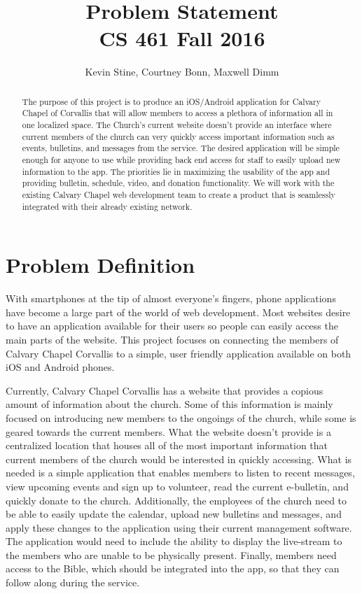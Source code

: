 \documentclass[letterpaper,10pt,draftclsnofoot,onecolumn,titlepage]{IEEEtran}
\def\name{Kevin Stine, Courtney Bonn, Maxwell Dimm}
\begin{document}
	\title{\huge Problem Statement \\ CS 461 Fall 2016}
	\author{\large \name}
	
	\maketitle
		\begin{abstract}The purpose of this project is to produce an iOS/Android application for Calvary Chapel of Corvallis that will allow members to access a plethora of information all in one localized space. 
		The Church's current website doesn't provide an interface where current members of the church can very quickly access important information such as events, bulletins, and messages from the service. 
		The desired application will be simple enough for anyone to use while providing back end access for staff to easily upload new information to the app. 
		The priorities lie in maximizing the usability of the app and providing bulletin, schedule, video, and donation functionality. 
		We will work with the existing Calvary Chapel web development team to create a product that is seamlessly integrated with their already existing network. 
		\end{abstract}
	
	\clearpage	
		
	\section*{Problem Definition}
		With smartphones at the tip of almost everyone's fingers, phone applications have become a large part of the world of web development. 
	Most websites desire to have an application available for their users so people can easily access the main parts of the website. 
	This project focuses on connecting the members of Calvary Chapel Corvallis to a simple, user friendly application available on both iOS and Android phones. 

	Currently, Calvary Chapel Corvallis has a website that provides a copious amount of information about the church. 
	Some of this information is mainly focused on introducing new members to the ongoings of the church, while some is geared towards the current members.
	What the website doesn't provide is a centralized location that houses all of the most important information that current members of the church would be interested in quickly accessing.
	What is needed is a simple application that enables members to listen to recent messages, view upcoming events and sign up to volunteer, read the current e-bulletin, and quickly donate to the church. 
	Additionally, the employees of the church need to be able to easily update the calendar, upload new bulletins and messages, and apply these changes to the application using their current management software. 
	The application would need to include the ability to display the live-stream to the members who are unable to be physically present. 
	Finally, members need access to the Bible, which should be integrated into the app, so that they can follow along during the service. 	
	
\end{document}
